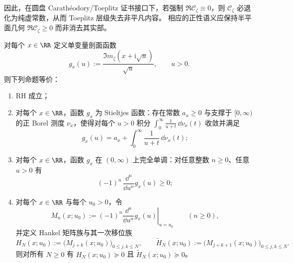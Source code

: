 \begin{remark}\label{rem:xi-carath-degeneracy-no-cancellation}
因此，在圆盘 Carath\'eodory/Toeplitz 证书接口下，若强制 \(\Re \mathscr{C}_{\zeta}\equiv 0\)，则 \(\mathscr{C}_{\zeta}\) 必退化为纯虚常数，从而 Toeplitz 层级失去非平凡内容。
相应的正性语义应保持半平面几何 \(\Re \mathscr{C}_{\zeta}\ge 0\) 而非消去其实部。
\end{remark}

\begin{theorem}\label{thm:xi-axis-swap-stieltjes-hankel-criterion}
对每个 \(x\in\RR\) 定义单变量剖面函数
\begin{equation}\label{eq:xi-gx-stieltjes-profile}
g_x(u):=\frac{\Im m_{\zeta}\!\left(x+\mathrm{i}\sqrt{u}\right)}{\sqrt{u}},\qquad u>0.
\end{equation}
则下列命题等价：
\begin{enumerate}
  \item RH 成立；
  \item 对每个 \(x\in\RR\)，函数 \(g_x\) 为 Stieltjes 函数：存在常数 \(a_x\ge 0\) 与支撑于 \([0,\infty)\) 的正 Borel 测度 \(\nu_x\)，使得对每个 \(u>0\) 积分 \(\int_{0}^{\infty}\frac{1}{u+t}\,\dd\nu_x(t)\) 收敛并满足
  \[
  g_x(u)=a_x+\int_{0}^{\infty}\frac{1}{u+t}\,\dd\nu_x(t);
  \]
  \item 对每个 \(x\in\RR\)，函数 \(g_x\) 在 \((0,\infty)\) 上完全单调：对任意整数 \(n\ge 0\)、任意 \(u>0\) 有
  \[
  (-1)^n\,\frac{\dd^n}{\dd u^n}g_x(u)\ge 0;
  \]
  \item 对每个 \(x\in\RR\) 与每个 \(u_0>0\)，令
  \[
  M_n(x;u_0):=(-1)^n\left.\frac{\dd^n}{\dd u^n}g_x(u)\right|_{u=u_0}\qquad(n\ge 0),
  \]
  并定义 Hankel 矩阵族与其一次移位族
  \[
  H_N(x;u_0):=\bigl(M_{j+k}(x;u_0)\bigr)_{0\le j,k\le N},\qquad
  \widetilde H_N(x;u_0):=\bigl(M_{j+k+1}(x;u_0)\bigr)_{0\le j,k\le N}.
  \]
  则对所有 \(N\ge 0\) 有 \(H_N(x;u_0)\succeq 0\) 且 \(\widetilde H_N(x;u_0)\succeq 0\)。
\end{enumerate}
\end{theorem}

